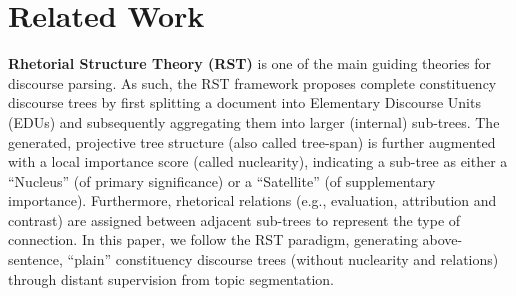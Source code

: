 \documentclass[letterpaper]{article} %
\begin{document}
\section{Related Work}
\textbf{Rhetorial Structure Theory (RST) } \cite{mann1988rhetorical} is one of the main guiding theories for discourse parsing. As such, the RST framework proposes complete constituency discourse trees by first splitting a document into Elementary Discourse Units (EDUs) and subsequently aggregating them into larger (internal) sub-trees. The generated, projective tree structure (also called tree-span) is further augmented with a local importance score (called nuclearity), indicating a sub-tree as either a ``Nucleus'' (of primary significance) or a ``Satellite'' (of supplementary importance).
Furthermore, rhetorical relations (e.g., evaluation, attribution and contrast) are assigned between adjacent sub-trees to represent the type of connection.
In this paper, we follow the RST paradigm, generating above-sentence, ``plain'' constituency discourse trees (without nuclearity and relations) through distant supervision from topic segmentation.
\end{document}
